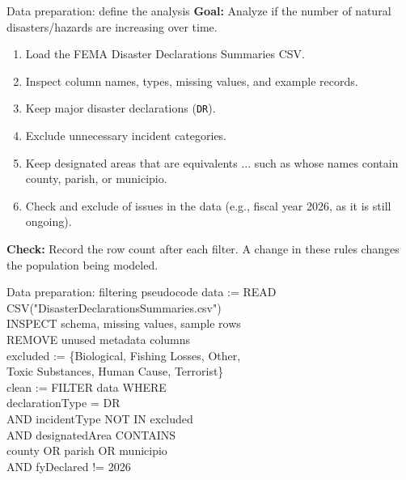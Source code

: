 \documentclass[11pt,aspectratio=43]{beamer}
\begin{document}
\begin{frame}{Data preparation: define the analysis}
\textbf{Goal:} Analyze if the number of natural disasters/hazards are increasing over time.
\begin{enumerate}
  \item Load the FEMA Disaster Declarations Summaries CSV.
  \item Inspect column names, types, missing values, and example records.
  \item Keep major disaster declarations (\texttt{DR}).
  \item Exclude unnecessary incident categories.
  \item Keep designated areas that are equivalents ... such as whose names contain county, parish, or municipio.
  \item Check and exclude of issues in the data (e.g., fiscal year 2026, as it is still ongoing).
\end{enumerate}
\smallskip
\textbf{Check:} Record the row count after each filter. A change in these rules changes the population being modeled.
\end{frame}

\begin{frame}{Data preparation: filtering pseudocode}
\ttfamily\small
data := READ CSV("DisasterDeclarationsSummaries.csv")\\[0.5em]
INSPECT schema, missing values, sample rows\\
REMOVE unused metadata columns\\[0.5em]
excluded := \{Biological, Fishing Losses, Other,\\
\hspace*{2em}Toxic Substances, Human Cause, Terrorist\}\\[0.5em]
clean := FILTER data WHERE\\
\hspace*{2em}declarationType = DR\\
\hspace*{2em}AND incidentType NOT IN excluded\\
\hspace*{2em}AND designatedArea CONTAINS\\
\hspace*{4em}county OR parish OR municipio\\
\hspace*{2em}AND fyDeclared != 2026
\end{frame}
\end{document}
